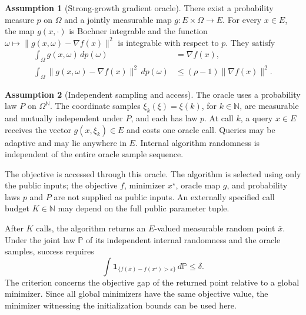 \documentclass[10pt]{article}
\theoremstyle{definition}
\newtheorem{assumption}{Assumption}
\begin{document}
\begin{assumption}[Strong-growth gradient oracle]
There exist a probability measure $p$ on $\Omega$ and a jointly measurable map $g:E\times\Omega\to E$. For every $x\in E$, the map $g(x,\cdot)$ is Bochner integrable and the function $\omega\mapsto\|g(x,\omega)-\nabla f(x)\|^2$ is integrable with respect to $p$. They satisfy
\[
\begin{aligned}
\int_\Omega g(x,\omega)\,dp(\omega)&=\nabla f(x),\\
\int_\Omega\|g(x,\omega)-\nabla f(x)\|^2\,dp(\omega)
&\leq(\rho-1)\|\nabla f(x)\|^2.
\end{aligned}
\]
\end{assumption}

\begin{assumption}[Independent sampling and access]
The oracle uses a probability law $P$ on $\Omega^{\mathbb{N}}$. The coordinate samples $\xi_k(\xi)=\xi(k)$, for $k\in\mathbb{N}$, are measurable and mutually independent under $P$, and each has law $p$. At call $k$, a query $x\in E$ receives the vector $g(x,\xi_k)\in E$ and costs one oracle call. Queries may be adaptive and may lie anywhere in $E$. Internal algorithm randomness is independent of the entire oracle sample sequence.
\end{assumption}

The objective is accessed through this oracle. The algorithm is selected using only the public inputs; the objective $f$, minimizer $x^\star$, oracle map $g$, and probability laws $p$ and $P$ are not supplied as public inputs. An externally specified call budget $K\in\mathbb{N}$ may depend on the full public parameter tuple.

After $K$ calls, the algorithm returns an $E$-valued measurable random point $\bar{x}$. Under the joint law $\mathbb{P}$ of its independent internal randomness and the oracle samples, success requires
\[
\int \mathbf{1}_{\{f(\bar{x})-f(x^\star)>\varepsilon\}}\,d\mathbb{P}
\leq\delta.
\]
The criterion concerns the objective gap of the returned point relative to a global minimizer. Since all global minimizers have the same objective value, the minimizer witnessing the initialization bounds can be used here.
\end{document}
